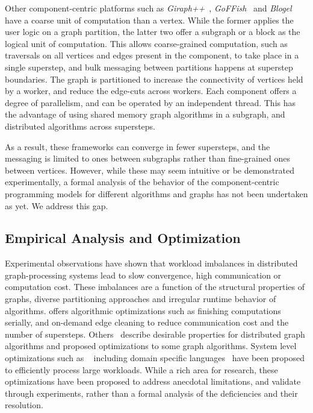 \documentclass[10pt,conference, compsocconf]{IEEEtran}
\begin{document}
Other component-centric platforms such as \emph{Giraph++}~\cite{giraph++}, \emph{GoFFish}~\cite{goffish} and \emph{Blogel}~\cite{blogel} have a coarse unit of computation than a vertex. While the former applies the user logic on a graph partition, the latter two offer a subgraph or a block as the logical unit of computation. This allows coarse-grained computation, such as traversals on all vertices and edges present in the component, to take place in a single superstep, and bulk messaging between partitions happens at superstep boundaries. The graph is partitioned to increase the connectivity of vertices held by a worker, and reduce the edge-cuts across workers. Each component offers a degree of parallelism, and can be operated by an independent thread. This has the advantage of using shared memory graph algorithms in a subgraph, and distributed algorithms across supersteps. 

As a result, these frameworks can converge in fewer supersteps, and the messaging is limited to ones between subgraphs rather than fine-grained ones between vertices. However, while these may seem intuitive or be demonstrated experimentally, a formal analysis of the behavior of the component-centric programming models for different algorithms and graphs has not been undertaken as yet. We address this gap.

\subsection{Empirical Analysis and Optimization} 

Experimental observations have shown that workload imbalances in distributed graph-processing systems lead to slow convergence, high communication or computation cost. 
These imbalances are a function of the structural properties of graphs, diverse partitioning approaches and irregular runtime behavior of algorithms. \cite{salihoglu2014optimizing} offers algorithmic optimizations such as finishing computations serially, and on-demand edge cleaning to reduce communication cost and the number of supersteps. Others~\cite{yan2014pregel} describe desirable properties for distributed graph algorithms and proposed optimizations to some graph algorithms. System level optimizations such as ~\cite{shao2015page} including domain specific languages~\cite{hong2014simplifying} have been proposed to efficiently process large workloads. While a rich area for research, these optimizations have been proposed to address anecdotal limitations, and validate through experiments, rather than a formal analysis of the deficiencies and their resolution.
\end{document}
